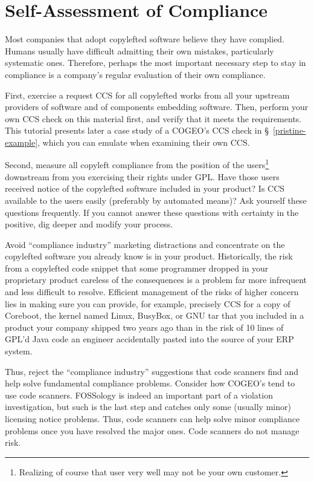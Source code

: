 \section{Self-Assessment of Compliance}

Most companies that adopt copylefted software believe they have complied.
Humans usually have difficult admitting their own mistakes, particularly
systematic ones.  Therefore, perhaps the most important necessary step to
stay in compliance is a company's regular evaluation of their own compliance.

First, exercise a request CCS for all copylefted works from all your upstream
providers of software and of components embedding software.  Then, perform
your own CCS check on this material first, and verify that it meets the
requirements.  This tutorial presents later a case study of a COGEO's CCS
check in \S~\ref{pristine-example}, which you can emulate when examining
their own CCS\@.

Second, measure all copyleft compliance from the position of the
users\footnote{Realizing of course that user very well may not be your own
  customer.} downstream from you exercising their rights under GPL\@.  Have
those users received notice of the copylefted software included in your
product?  Is CCS available to the users easily (preferably by automated
means)?  Ask yourself these questions frequently.  If you cannot answer these
questions with certainty in the positive, dig deeper and modify your process.

Avoid ``compliance industry'' marketing distractions and concentrate on the
copylefted software you already know is in your product.  Historically, the
risk from a copylefted code snippet that some programmer dropped in your
proprietary product careless of the consequences is a problem far more
infrequent and less difficult to resolve.  Efficient management of the risks
of higher concern lies in making sure you can provide, for example, precisely
CCS for a copy of Coreboot, the kernel named Linux, BusyBox, or GNU tar that
you included in a product your company shipped two years ago than in the risk
of 10 lines of GPL'd Java code an engineer accidentally pasted into the
source of your ERP system.

Thus, reject the ``compliance industry'' suggestions that code scanners find
and help solve fundamental compliance problems.  Consider how COGEO's tend to
use code scanners.  FOSSology is indeed an important part of a violation
investigation, but such is the last step and catches only some (usually
minor) licensing notice problems.  Thus, code scanners can help solve minor
compliance problems once you have resolved the major ones.  Code scanners
do not manage risk.

